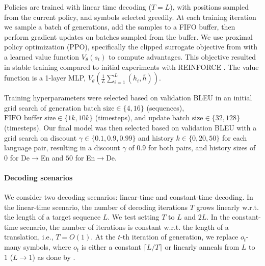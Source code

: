 \documentclass{article}
\begin{document}
Policies are trained with linear time decoding ($T=L$), with positions sampled from the current policy, and symbols selected greedily. 
At each training iteration we sample a batch of generations, add the samples to a FIFO buffer, then perform  gradient updates on batches sampled from the buffer. 
We use proximal policy optimization (PPO), specifically the clipped surrogate objective from \citet{schulman2017proximal} with a learned value function $V_{\theta}(s_t)$ to compute advantages. 
This objective resulted in stable training compared to initial experiments with REINFORCE \cite{williams1992simple}. The value function is a 1-layer MLP, $V_{\theta}(\frac{1}{L}\sum_{i=1}^L(h_i,\bar{h}))$. 

Training hyperparameters were selected based on validation BLEU in an initial grid search of $\text{generation batch size}\in \{4,16\}$ (sequences), $\text{FIFO buffer size}\in \{1k,10k\}$ (timesteps), and $\text{update batch size}\in \{32,128\}$ (timesteps). Our final model was then selected based on validation BLEU with a grid search on $\text{discount }\gamma\in\{0.1,0.9,0.99\}$ and $\text{history }k\in\{0,20,50\}$ for each language pair, resulting in a discount $\gamma$ of $0.9$ for both pairs, and history sizes of $0$ for De$\rightarrow$En and $50$ for En$\rightarrow$De.



\paragraph{Decoding scenarios}

We consider two decoding scenarios: linear-time and constant-time decoding. In the linear-time scenario, the number of decoding iterations $T$ grows linearly w.r.t. the length of a target sequence $L$. We test setting $T$ to $L$ and $2L$. In the constant-time scenario, the number of iterations is constant w.r.t. the length of a translation, i.e., $T=O(1)$. At the $t$-th iteration of generation, we replace $o_t$-many symbols, where $o_t$ is either a constant $\lceil L/T \rceil$ or linearly anneals from $L$ to $1$ ($L\to 1$) as done by \citet{ghazvininejad2019constant}. 
\end{document}
